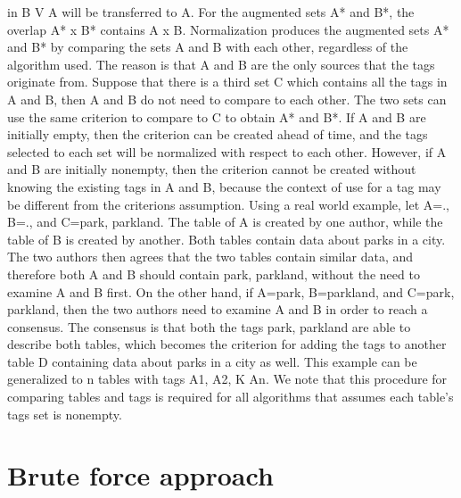 in B V A will be transferred to A. For the augmented sets A* and B*, the overlap A* x B* contains A x B. Normalization produces the augmented sets A* and B* by comparing the sets A and B with each other, regardless of the algorithm used. The reason is that A and B are the only sources that the tags originate from. Suppose that there is a third set C which contains all the tags in A and B, then A and B do not need to compare to each other. The two sets can use the same criterion to compare to C to obtain A* and B*. If A and B are initially empty, then the criterion can be created ahead of time, and the tags selected to each set will be normalized with respect to each other. However, if A and B are initially nonempty, then the criterion cannot be created without knowing the existing tags in A and B, because the context of use for a tag may be different from the criterions assumption.
Using a real world example, let A=., B=., and C={park, parkland}. The table of A is created by one author, while the table of B is created by another. Both tables contain data about parks in a city. The two authors then agrees that the two tables contain similar data, and therefore both A and B should contain {park, parkland}, without the need to examine A and B first. On the other hand, if A={park}, B={parkland}, and C={park, parkland}, then the two authors need to examine A and B in order to reach a consensus. The consensus is that both the tags park, parkland are able to describe both tables, which becomes the criterion for adding the tags to another table D containing data about parks in a city as well. This example can be generalized to n tables with tags A1, A2, K An.
We note that this procedure for comparing tables and tags is required for all algorithms that assumes each table's tags set is nonempty.

\section{Brute force approach}
\label{sec:BruteForceApproach}

